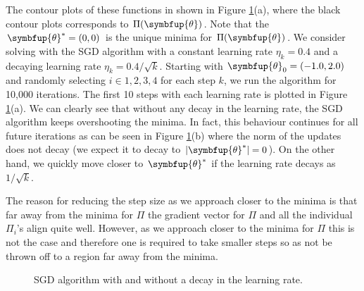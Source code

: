 \documentclass[11pt]{extarticle}
\theoremstyle{definition}
\newcommand{\btheta}{\symbfup{\theta}}
\begin{document}
The contour plots of these functions in shown in Figure \ref{fig:sgd}(a), where the black contour plots corresponds to $\Pi(\btheta)$.  Note that the $\btheta^* = (0,0)$ is the unique minima for $\Pi(\btheta)$. We consider solving with the SGD algorithm with a constant learning rate $\eta_k=0.4$ and a decaying learning rate $\eta_k = 0.4/\sqrt{k}$. Starting with $\btheta_0=(-1.0,2.0)$ and randomly selecting $i \in {1,2,3,4}$ for each step $k$, we run the algorithm for 10,000 iterations. The first 10 steps with each learning rate is plotted in Figure \ref{fig:sgd}(a). We can clearly see that without any decay in the learning rate, the SGD algorithm keeps overshooting the minima. In fact, this behaviour continues for all future iterations as can be seen in Figure \ref{fig:sgd}(b) where the norm of the updates does not decay (we expect it to decay to $|\btheta^*| = 0$). On the other hand, we quickly move closer to $\btheta^*$ if the learning rate decays as $1/\sqrt{k}$. 

The reason for reducing the step size as we approach closer to the minima is that far away from the minima for $\Pi$ the gradient vector for $\Pi$ and all the individual $\Pi_i$'s align quite well. However, as we approach closer to the minima for $\Pi$ this is not the case and therefore one is required to take smaller steps so as not be thrown off to a region far away from the minima. 

\begin{figure}[htbp!]
  \begin{center}
    \caption{SGD algorithm with and without a decay in the learning rate.}
    \label{fig:sgd}
  \end{center}
\end{figure}
\end{document}
